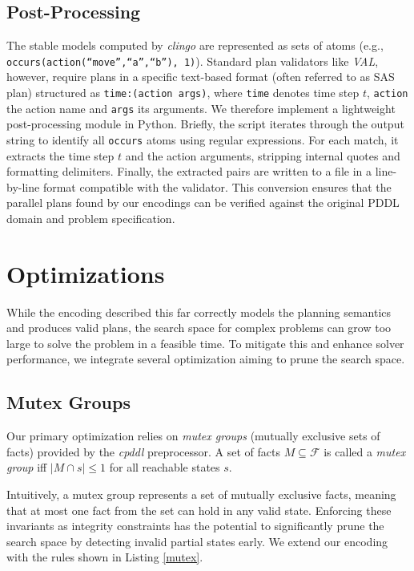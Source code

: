 \documentclass[
     11pt,                    %
     a4paper,             %
     BCOR=10mm,     %
     DIV=14,                 %
     listof=totoc,                    %
     bibliography=totoc,       %
     index=totoc,              %
     parskip            %
     twoside,
     headsepline
     ]{scrreprt}
\theoremstyle{definition}
\theoremstyle{definition}
\theoremstyle{remark}
\theoremstyle{bfnote}
\begin{document}
\subsection{Post-Processing}
The stable models computed by \textit{clingo} are represented as sets of atoms (e.g., \\ \texttt{occurs(action(\enquote{move},\enquote{a},\enquote{b}), 1)}).
Standard plan validators like \textit{VAL}, however, require plans in a specific text-based format (often referred to as SAS plan) structured as \mbox{\texttt{time:(action args)}}, where \texttt{time} denotes time step $t$, \texttt{action} the action name and \texttt{args} its arguments.
We therefore implement a lightweight post-processing module in Python.
Briefly, the script iterates through the output string to identify all \texttt{occurs} atoms using regular expressions. 
For each match, it extracts the time step $t$ and the action arguments, stripping internal quotes and formatting delimiters. 
Finally, the extracted pairs are written to a file in a line-by-line format compatible with the validator.
This conversion ensures that the parallel plans found by our encodings can be verified against the original PDDL domain and problem specification.

\section{Optimizations}
While the encoding described this far correctly models the planning semantics and produces valid plans, the search space for complex problems can grow too large to solve the problem in a feasible time. To mitigate this and enhance solver performance, we integrate several optimization aiming to prune the search space.

\subsection{Mutex Groups}
Our primary optimization relies on \textit{mutex groups} (mutually exclusive sets of facts) provided by the \textit{cpddl} preprocessor.
A set of facts $M \subseteq \mathcal F$ is called a \textit{mutex group} iff $| M \cap s | \le 1$ for all reachable states $s$.

Intuitively, a mutex group represents a set of mutually exclusive facts, meaning that at most one fact from the set can hold in any valid state. Enforcing these invariants as integrity constraints has the potential to significantly prune the search space by detecting invalid partial states early.
We extend our encoding with the rules shown in Listing \ref{mutex}.
\end{document}
